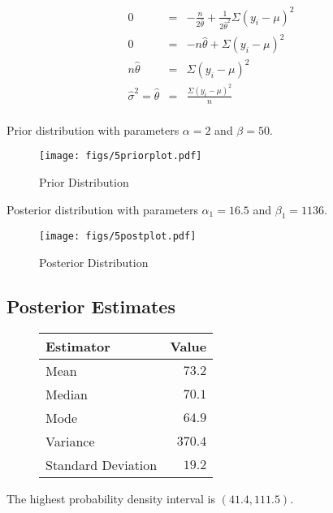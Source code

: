 \documentclass[12pt]{article}
\begin{document}
\begin{eqnarray*}
0 &=& -\frac{n}{2\hat{\theta}}+\frac{1}{2\hat{\theta}^2}\Sigma(y_i-\mu)^2 \\
0 &=& -n\hat{\theta}+\Sigma(y_i-\mu)^2 \\
n\hat{\theta} &=& \Sigma(y_i-\mu)^2 \\
\hat{\sigma}^2=\hat{\theta} &=& \frac{\Sigma(y_i-\mu)^2}{n} \\
\end{eqnarray*}

\noindent Prior distribution with parameters $\alpha=2$ and $\beta=50$.

\begin{figure}[H]
\begin{center}
\texttt{[image: figs/5priorplot.pdf]}
\caption{Prior Distribution}
\end{center}
\end{figure}

\noindent Posterior distribution with parameters $\alpha_1=16.5$ and $\beta_1=1136$.

\begin{figure}[H]
\begin{center}
\texttt{[image: figs/5postplot.pdf]}
\caption{Posterior Distribution}
\end{center}
\end{figure}

\subsection{Posterior Estimates}

\begin{figure}[H]
\begin{center}
\begin{tabular}{l|r}
Estimator & \multicolumn{1}{l}{Value} \\ \hline \hline
Mean               & $73.2$ \\
Median             & $70.1$ \\
Mode               & $64.9$ \\
Variance           & $370.4$ \\
Standard Deviation & $19.2$ \\
\end{tabular}
\end{center}
\end{figure}

The highest probability density interval is $(41.4, 111.5)$.
\end{document}
